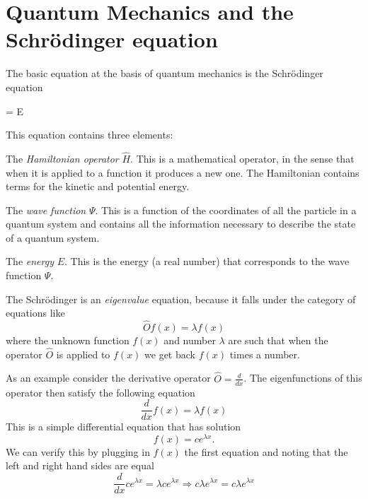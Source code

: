\documentclass[../Main/notes.tex]{subfiles}
\begin{document}
\section{Quantum Mechanics and the Schr\"{o}dinger equation}
The basic equation at the basis of quantum mechanics is the Schr\"{o}dinger equation
\begin{iequation}
\Psi = E \Psi
\end{iequation}
This equation contains three elements:
\begin{myitems}
\item The \emph{Hamiltonian operator} $\hat{H}$. This is a mathematical operator, in the sense that when it is applied to a function it produces a new one. The Hamiltonian contains terms for the kinetic and potential energy.
\item The \emph{wave function} $\Psi$. This is a function of the coordinates of all the particle in a quantum system and contains all the information necessary to describe the state of a quantum system.
\item The \emph{energy} $E$. This is the energy (a real number) that corresponds to the wave function $\Psi$.
\end{myitems}
The Schr\"{o}dinger is an \emph{eigenvalue} equation, because it falls under the category of equations like
\begin{equation}
\hat{O} f(x) = \lambda f(x)
\end{equation}
where the unknown function $f(x)$ and number $\lambda$ are such that when the operator $\hat{O}$ is applied to $f(x)$ we get back $f(x)$ times a number.
\begin{example}
As an example consider the derivative operator $\hat{O} = \frac{d}{dx}$.
The eigenfunctions of this operator then satisfy the following equation
\begin{equation}
\frac{d}{dx} f(x) = \lambda f(x)
\end{equation}
This is a simple differential equation that has solution
\begin{equation}
f(x) = c e^{\lambda x}.
\end{equation}
We can verify this by plugging in $f(x)$ the first equation and noting that the left and right hand sides are equal
\begin{equation}
\frac{d}{dx} c e^{\lambda x} = \lambda c e^{\lambda x} \Rightarrow 
c \lambda e^{\lambda x} = c \lambda e^{\lambda x} 
\end{equation}
\end{example}
\end{document}
